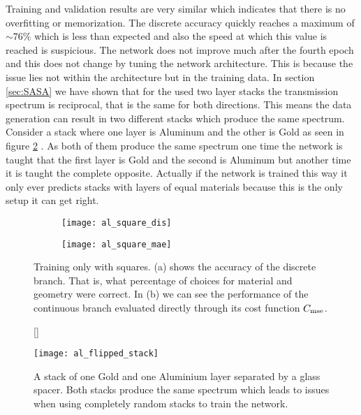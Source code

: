 \indent
Training and validation results are very similar which indicates that there is no overfitting or memorization. The discrete accuracy quickly reaches a maximum of $\sim 76\%$ which is less than expected and also the speed at which this value is reached is suspicious. The network does not improve much after the fourth epoch and this does not change by tuning the network architecture. This is because the issue lies not within the architecture but in the training data. In section \ref{sec:SASA} we have shown that for the used two layer stacks the transmission spectrum is reciprocal, that is the same for both directions. This means the data generation can result in two different stacks which produce the same spectrum. Consider a stack where one layer is Aluminum and the other is Gold as seen in figure \ref{fig:al:same_spec} . As both of them produce the same spectrum one time the network is taught that the first layer is Gold and the second is Aluminum but another time it is taught the complete opposite. Actually if the network is trained this way it only ever predicts stacks with layers of equal materials because this is the only setup it can get right.

\begin{figure}[H]
    \centering
    \captionsetup[subfigure]{position=b}
    \begin{subfigure}{.5\textwidth}
        \centering
        \texttt{[image: al\_square\_dis]}
        \caption{}
    \end{subfigure}%
    \begin{subfigure}{.5\textwidth}
        \centering
        \texttt{[image: al\_square\_mae]}
        \caption{}
    \end{subfigure}
    
    \caption{Training only with squares. (a) shows the accuracy of the discrete branch. That is, what percentage of choices for material and geometry were correct. In (b) we can see the performance of the continuous branch evaluated directly through its cost function $C_{\mathrm{mse}}$.}
    \label{fig:al:square_results}
    \end{figure}

\begin{figure}[H]
    [\FBwidth]
    {\caption{A stack of one Gold and one Aluminium layer separated by a glass spacer. Both stacks produce the same spectrum which leads to issues when using completely random stacks to train the network.}
    \label{fig:al:same_spec}}
    {\texttt{[image: al\_flipped\_stack]}}
\end{figure}


